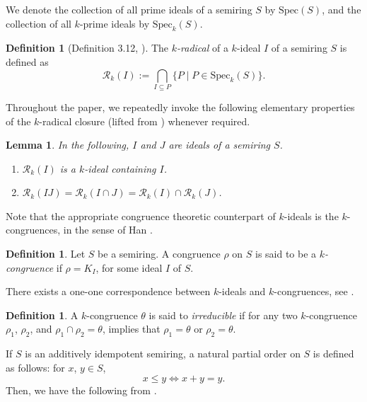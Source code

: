 \documentclass[11pt,english]{amsart}
\newtheorem{lemma}[theorem]{Lemma}
\theoremstyle{definition}
\newtheorem{definition}[theorem]{Definition}
\numberwithin{equation}{section}
\begin{document}
We denote the collection of all prime ideals of a semiring $S$ by $\mathrm{Spec}(S)$, and the collection of all $k$-prime ideals by $\mathrm{Spec}_k(S)$. 

\begin{definition}[Definition 3.12, \cite{GoswamiDube24}]
    The \emph{$k$-radical} of a $k$-ideal $I$ of a semiring $S$ is defined as \[\mathcal{R}_k(I):=\bigcap_{I\subseteq P}\{P\mid P\in \mathrm{Spec}_k(S)\}.\]
\end{definition}

 Throughout the paper, we repeatedly invoke the following elementary properties of the $k$-radical closure (lifted from \cite[Lemma 3.13]{GoswamiDube24}) whenever required.

\begin{lemma} In the following, $I$ and $J$ are ideals of a semiring $S$.
\begin{enumerate}
    \item $\mathcal{R}_k(I)$ is a $k$-ideal containing $I$.
    \item $\mathcal{R}_k(IJ)=\mathcal{R}_k(I\cap J)=\mathcal{R}_k(I)\cap \mathcal{R}_k(J)$.
\end{enumerate}
\end{lemma}

Note that the appropriate congruence theoretic counterpart of $k$-ideals is the $k$-congruences, in the sense of Han \cite[Definition 3.2]{Han21}. 

\begin{definition} \label{Def: k-congruence}
    Let $S$ be a semiring. A congruence $\rho$ on $S$ is said to be a \emph{$k$-congruence} if $\rho=K_I$, for some ideal $I$ of $S$.

\end{definition}

There exists a one-one correspondence between $k$-ideals and $k$-congruences, see \cite[Theorem 3.8]{Han21}.

\begin{definition}
    A $k$-congruence $\theta$ is said to \emph{irreducible} if for any two $k$-congruence $\rho_1$, $\rho_2$, and $\rho_1\cap \rho_2=\theta$, implies that $\rho_1=\theta$ or $\rho_2=\theta$.
\end{definition}

If $S$ is an additively idempotent semiring, a natural partial order on $S$ is defined as follows: for $x$, $y\in S$, \[x\leqslant y \Longleftrightarrow x+y=y.\]
Then, we have the following from \cite[Proposition 3.11]{JunRayTolliver22}. 
\end{document}
